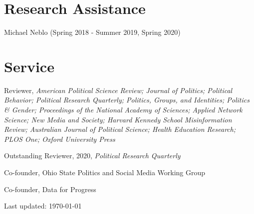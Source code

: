 \documentclass[letterpaper]{article}
\renewenvironment{itemize}{
  \begin{list}{}{
    \setlength{\leftmargin}{1.5em}
  }
}{
  \end{list}
}
\begin{document}
\section*{Research Assistance}
\begin{itemize}
\item  Michael Neblo (Spring 2018 - Summer 2019, Spring 2020)
\end{itemize}

\section*{Service}

\begin{itemize}
\item Reviewer, \textit{American Political Science Review; Journal of Politics; Political Behavior; Political Research Quarterly; Politics, Groups, and Identities; Politics \& Gender; Proceedings of the National Academy of Sciences; Applied Network Science; New Media and Society; Harvard Kennedy School Misinformation Review; Australian Journal of Political Science; Health Education Research; PLOS One; Oxford University Press}
\begin{itemize}
Outstanding Reviewer, 2020, \textit{Political Research Quarterly}
\end{itemize}
\item Co-founder, Ohio State Politics and Social Media Working Group
\item Co-founder, Data for Progress
\end{itemize}

\begin{center}
  \begin{footnotesize}
    Last updated: \today
      \end{footnotesize}
\end{center}
\end{document}
